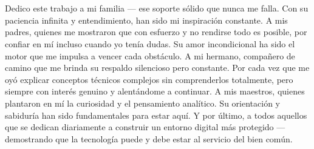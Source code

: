 \newpage
\chapter*{}
Dedico este trabajo a mi familia — ese soporte sólido que nunca me falla. Con su paciencia infinita y entendimiento, han sido mi inspiración constante. A mis padres, quienes me mostraron que con esfuerzo y no rendirse todo es posible, por confiar en mí incluso cuando yo tenía dudas. Su amor incondicional ha sido el motor que me impulsa a vencer cada obstáculo.
A mi hermano, compañero de camino que me brinda su respaldo silencioso pero constante. Por cada vez que me oyó explicar conceptos técnicos complejos sin comprenderlos totalmente, pero siempre con interés genuino y alentándome a continuar.
A mis maestros, quienes plantaron en mí la curiosidad y el pensamiento analítico. Su orientación y sabiduría han sido fundamentales para estar aquí.
Y por último, a todos aquellos que se dedican diariamente a construir un entorno digital más protegido — demostrando que la tecnología puede y debe estar al servicio del bien común.